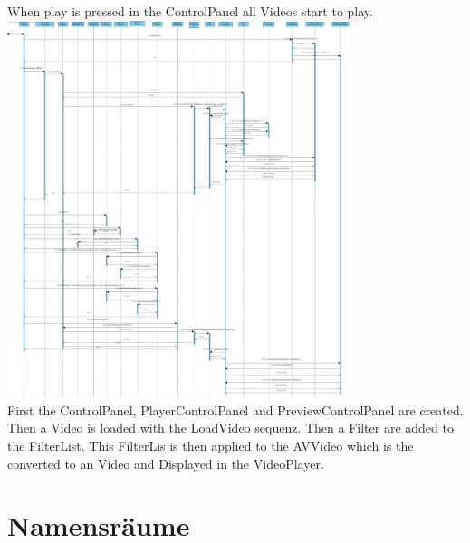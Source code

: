 \documentclass[twoside]{book}
\newcommand{\+}{\discretionary{\mbox{\scriptsize$\hookleftarrow$}}{}{}}
\begin{document}
When play is pressed in the ControlPanel all Videos start to play.
\newpage
{\centering\includegraphics[width=10cm]{Sequence Diagram3.jpg}}\\
First the ControlPanel, PlayerControlPanel and PreviewControlPanel are created.
Then a Video is loaded with the LoadVideo sequenz. Then a Filter are added to the FilterList. This FilterLis is then applied to the AVVideo which is the converted to an Video and Displayed in the VideoPlayer.
\chapter{Namensräume}








\end{document}
